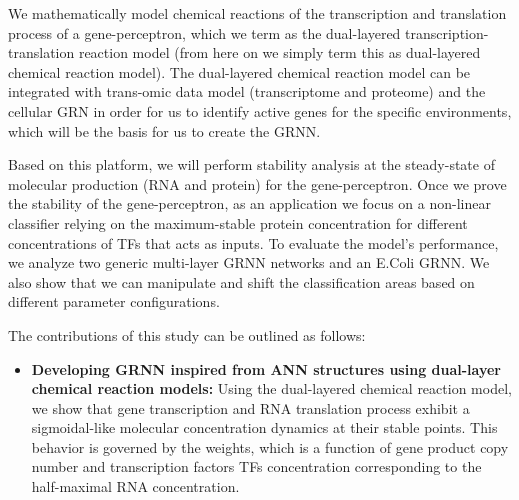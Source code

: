 \documentclass[twocolumn]{biophys-new}
\newcommand{\sm}[1]{\textcolor{brown}{#1}}
\begin{document}
{{%
We mathematically model chemical reactions of the transcription and translation process of a gene-perceptron, which we term as the dual-layered transcription-translation reaction model (from here on we simply term this as dual-layered chemical reaction model). The dual-layered chemical reaction model can be integrated with trans-omic data model (transcriptome and proteome) and the cellular GRN in order for us to identify active genes for the specific environments, which will be the basis for us to create the GRNN. 

Based on this platform, we will perform stability analysis at the steady-state of molecular production (RNA and protein) for the gene-perceptron. Once we prove the stability of the gene-perceptron, as an application we focus on a non-linear classifier relying on the maximum-stable protein concentration for different concentrations of TFs that acts as inputs. To evaluate the model's performance, we analyze two generic multi-layer GRNN networks and an E.Coli GRNN. %
We also show that we can manipulate and shift the classification areas based on different parameter configurations.

The contributions of this study can be outlined as follows: 
\begin{itemize}
    \item \textbf{Developing GRNN inspired from ANN structures using dual-layer chemical reaction models:}
         Using the dual-layered chemical reaction model, we show that gene transcription and RNA translation process  exhibit a sigmoidal-like molecular concentration dynamics at their stable points. This behavior is governed by the weights, which is a function of gene product copy number and transcription factors TFs concentration corresponding to the half-maximal RNA concentration. %
          

\end{itemize}}}
\end{document}
